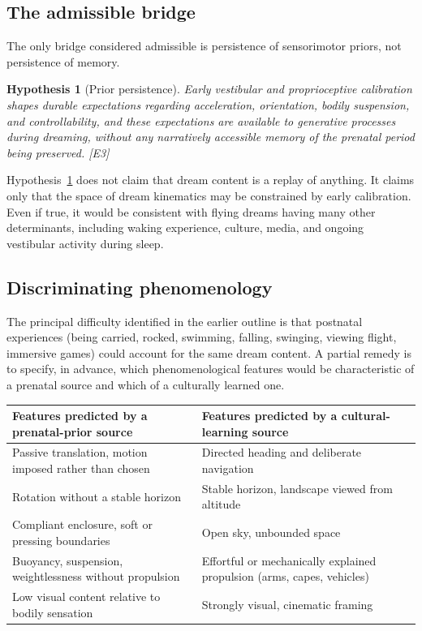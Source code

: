 \documentclass[11pt,a4paper]{article}
\theoremstyle{plain}
\newtheorem{hypothesis}{Hypothesis}[section]
\theoremstyle{definition}
\theoremstyle{remark}
\newcommand{\tier}[1]{\textup{\textsc{[#1]}}}
\newcommand{\Ethree}{\tier{E3}}
\begin{document}
\subsection{The admissible bridge}

The only bridge considered admissible is persistence of sensorimotor priors, not persistence of memory.

\begin{hypothesis}[Prior persistence]\label{hyp:prior}
Early vestibular and proprioceptive calibration shapes durable expectations regarding acceleration, orientation, bodily suspension, and controllability, and these expectations are available to generative processes during dreaming, without any narratively accessible memory of the prenatal period being preserved. \Ethree
\end{hypothesis}

\begin{caution}
Hypothesis~\ref{hyp:prior} does not claim that dream content is a replay of anything. It claims only that the space of dream kinematics may be constrained by early calibration. Even if true, it would be consistent with flying dreams having many other determinants, including waking experience, culture, media, and ongoing vestibular activity during sleep.
\end{caution}

\subsection{Discriminating phenomenology}

The principal difficulty identified in the earlier outline is that postnatal experiences (being carried, rocked, swimming, falling, swinging, viewing flight, immersive games) could account for the same dream content. A partial remedy is to specify, in advance, which phenomenological features would be characteristic of a prenatal source and which of a culturally learned one.

\begin{center}
\small
\begin{tabularx}{\textwidth}{@{}XX@{}}
\toprule
\textbf{Features predicted by a prenatal-prior source} & \textbf{Features predicted by a cultural-learning source} \\
\midrule
Passive translation, motion imposed rather than chosen & Directed heading and deliberate navigation \\
Rotation without a stable horizon & Stable horizon, landscape viewed from altitude \\
Compliant enclosure, soft or pressing boundaries & Open sky, unbounded space \\
Buoyancy, suspension, weightlessness without propulsion & Effortful or mechanically explained propulsion (arms, capes, vehicles) \\
Low visual content relative to bodily sensation & Strongly visual, cinematic framing \\
\bottomrule
\end{tabularx}
\end{center}
\end{document}
